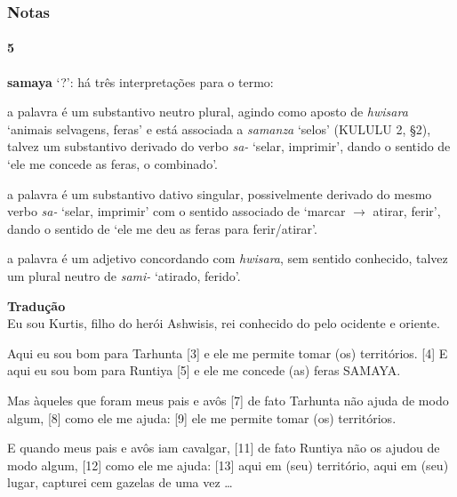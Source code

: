\documentclass{luvita}
\begin{document}
\subsubsection*{Notas}

\paragraph{5}
\textbf{samaya} `?': há três interpretações para o termo:
\begin{inparaenum}
	\item a palavra é um substantivo neutro plural, agindo como aposto de
	\emph{hwisara} `animais selvagens, feras' e está associada a
	\emph{samanza} `selos' (KULULU 2, §2), talvez um substantivo derivado do
	verbo \emph{sa-} `selar, imprimir',
	dando o sentido de `ele me concede as feras, o combinado'.
	\item a palavra é um substantivo dativo singular, possivelmente derivado do
	mesmo verbo \emph{sa-} `selar, imprimir' com o sentido associado de
	`marcar $\rightarrow$ atirar, ferir', dando o sentido de `ele me deu as
	feras para ferir\slash{}atirar'.
	\item a palavra é um adjetivo concordando com \emph{hwisara}, sem sentido
	conhecido, talvez um plural neutro de \emph{sami-} `atirado, ferido'.
\end{inparaenum}

\bigskip
\noindent \textbf{Tradução}\\
\noindent [1] Eu sou Kurtis, filho do herói Ashwisis, rei conhecido do
pelo ocidente e oriente.

\noindent [2] Aqui eu sou bom para Tarhunta [3] e ele me
permite tomar (os) territórios.
[4] E aqui eu sou bom para Runtiya [5] e ele me concede (as) feras SAMAYA\@.

\noindent [6] Mas àqueles que foram meus pais e avôs [7] de fato Tarhunta não
ajuda de modo algum, [8] como ele me ajuda: [9] ele me permite tomar (os)
territórios.

\noindent [10] E quando meus pais e avôs iam cavalgar, [11] de fato Runtiya não
os ajudou de modo algum, [12] como ele me ajuda: [13] aqui em (seu) território,
aqui em (seu) lugar, capturei cem gazelas de uma vez \ldots
\end{document}
